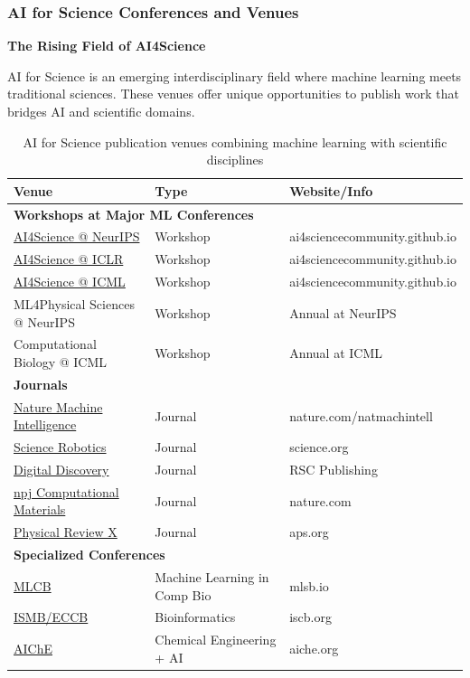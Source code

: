 \documentclass[11pt,a4paper]{article}
\begin{document}
\subsubsection{AI for Science Conferences and Venues}

\textbf{The Rising Field of AI4Science}

AI for Science is an emerging interdisciplinary field where machine learning meets traditional sciences. These venues offer unique opportunities to publish work that bridges AI and scientific domains.

\begin{table}[H]
\centering
\begin{tabular}{@{}lll@{}}
\toprule
\textbf{Venue} & \textbf{Type} & \textbf{Website/Info} \\
\midrule
\multicolumn{3}{l}{\textbf{Workshops at Major ML Conferences}} \\
\href{https://ai4sciencecommunity.github.io/}{AI4Science @ NeurIPS} & Workshop & ai4sciencecommunity.github.io \\
\href{https://ai4sciencecommunity.github.io/}{AI4Science @ ICLR} & Workshop & ai4sciencecommunity.github.io \\
\href{https://ai4sciencecommunity.github.io/}{AI4Science @ ICML} & Workshop & ai4sciencecommunity.github.io \\
ML4Physical Sciences @ NeurIPS & Workshop & Annual at NeurIPS \\
Computational Biology @ ICML & Workshop & Annual at ICML \\
\midrule
\multicolumn{3}{l}{\textbf{Journals}} \\
\href{https://www.nature.com/natmachintell/}{Nature Machine Intelligence} & Journal & nature.com/natmachintell \\
\href{https://www.science.org/journal/scirobotics}{Science Robotics} & Journal & science.org \\
\href{https://www.rsc.org/journals-books-databases/about-journals/digital-discovery/}{Digital Discovery} & Journal & RSC Publishing \\
\href{https://www.nature.com/npjcompumats/}{npj Computational Materials} & Journal & nature.com \\
\href{https://journals.aps.org/prx/}{Physical Review X} & Journal & aps.org \\
\midrule
\multicolumn{3}{l}{\textbf{Specialized Conferences}} \\
\href{https://www.mlsb.io/}{MLCB} & Machine Learning in Comp Bio & mlsb.io \\
\href{https://www.iscb.org/}{ISMB/ECCB} & Bioinformatics & iscb.org \\
\href{https://www.aiche.org/}{AIChE} & Chemical Engineering + AI & aiche.org \\
\bottomrule
\end{tabular}
\caption{AI for Science publication venues combining machine learning with scientific disciplines}
\end{table}
\end{document}
